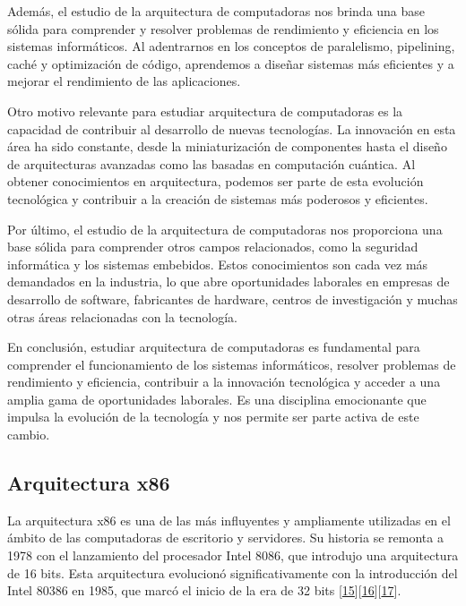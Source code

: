 \documentclass[12pt,twoside]{templates/unerthesis}
\begin{document}
Además, el estudio de la arquitectura de computadoras nos brinda una base sólida para comprender y resolver problemas de rendimiento y eficiencia en los sistemas informáticos. Al adentrarnos en los conceptos de paralelismo, pipelining, caché y optimización de código, aprendemos a diseñar sistemas más eficientes y a mejorar el rendimiento de las aplicaciones.

Otro motivo relevante para estudiar arquitectura de computadoras es la capacidad de contribuir al desarrollo de nuevas tecnologías. La innovación en esta área ha sido constante, desde la miniaturización de componentes hasta el diseño de arquitecturas avanzadas como las basadas en computación cuántica. Al obtener conocimientos en arquitectura, podemos ser parte de esta evolución tecnológica y contribuir a la creación de sistemas más poderosos y eficientes.

Por último, el estudio de la arquitectura de computadoras nos proporciona una base sólida para comprender otros campos relacionados, como la seguridad informática y los sistemas embebidos. Estos conocimientos son cada vez más demandados en la industria, lo que abre oportunidades laborales en empresas de desarrollo de software, fabricantes de hardware, centros de investigación y muchas otras áreas relacionadas con la tecnología.

En conclusión, estudiar arquitectura de computadoras es fundamental para comprender el funcionamiento de los sistemas informáticos, resolver problemas de rendimiento y eficiencia, contribuir a la innovación tecnológica y acceder a una amplia gama de oportunidades laborales. Es una disciplina emocionante que impulsa la evolución de la tecnología y nos permite ser parte activa de este cambio.

\hypertarget{arquitectura-x86}{%
\subsection{Arquitectura x86}\label{arquitectura-x86}}

La arquitectura x86 es una de las más influyentes y ampliamente utilizadas en el ámbito de las computadoras de escritorio y servidores. Su historia se remonta a 1978 con el lanzamiento del procesador Intel 8086, que introdujo una arquitectura de 16 bits. Esta arquitectura evolucionó significativamente con la introducción del Intel 80386 en 1985, que marcó el inicio de la era de 32 bits {[}\protect\hyperlink{ref-intel_64_2016}{15}{]}{[}\protect\hyperlink{ref-amd_developer_2019}{16}{]}{[}\protect\hyperlink{ref-abel_ibm_2000}{17}{]}.
\end{document}
